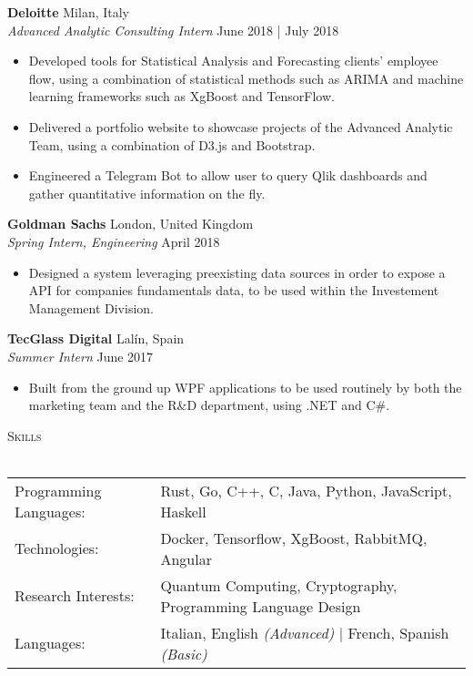 \documentclass[a4paper]{article}
\newcommand{\lineunder} {
    \vspace*{-8pt} \\
    \hspace*{-18pt} \hrulefill \\
}
\newcommand{\header} [1] {
    {\hspace*{-18pt}\vspace*{6pt} \textsc{#1}}
    \vspace*{-6pt} \lineunder
}
\begin{document}
\textbf{Deloitte} \hfill Milan, Italy\\
\textit{Advanced Analytic Consulting Intern} \hfill June 2018 | July 2018\\
\vspace{-1mm}
\begin{itemize} \itemsep 1pt
	\item Developed tools for Statistical Analysis and Forecasting clients' employee flow, using a combination of statistical methods such as ARIMA and machine learning frameworks such as XgBoost and TensorFlow. 
	\item Delivered a portfolio website to showcase projects of the Advanced Analytic Team, using a combination of D3.js and Bootstrap.
	\item Engineered a Telegram Bot to allow user to query Qlik dashboards and gather quantitative information on the fly. 
\end{itemize}

\textbf{Goldman Sachs} \hfill London, United Kingdom\\
\textit{Spring Intern, Engineering} \hfill April 2018\\
\begin{itemize} \itemsep 1pt
	\item Designed a system leveraging preexisting data sources in order to expose a API for companies fundamentals data, to be used within the Investement Management Division.  
\end{itemize}

\textbf{TecGlass Digital} \hfill Lalín, Spain\\
\textit{Summer Intern} \hfill June 2017\\
\begin{itemize} \itemsep 1pt
	\item Built from the ground up WPF applications to be used routinely by both the marketing team and the R\&D department, using .NET and C\#.
\end{itemize}


\header{Skills}
\begin{tabular}{ l l }
	Programming Languages: & Rust, Go, C++, C, Java, Python, JavaScript, Haskell \\
	Technologies:          & Docker, Tensorflow, XgBoost, RabbitMQ, Angular \\
	Research Interests: & Quantum Computing, Cryptography, Programming Language Design \\
	Languages:             & Italian, English  \textit{(Advanced)} | French, Spanish \textit{(Basic)} \\
\end{tabular}
\vspace{2mm}
\end{document}
